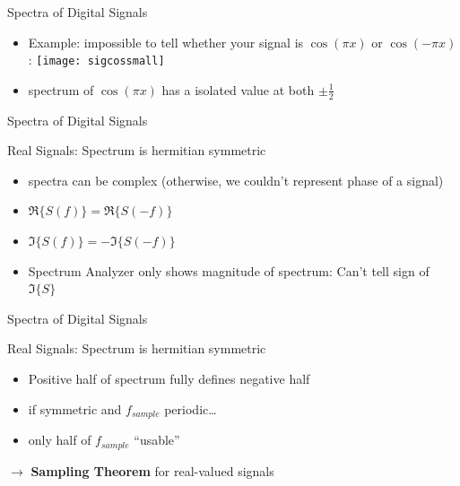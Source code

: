 \documentclass{beamer}
\begin{document}
\begin{frame}{Spectra of Digital Signals}{}

  \begin{itemize}
    \item Example: impossible to tell whether your signal is $\cos(\pi x)$ or $\cos(-\pi x)$:      \texttt{[image: sigcossmall]}
    \item spectrum of $\cos(\pi x)$ has a isolated  value at both $\pm \frac12$
  \end{itemize}

\end{frame}

\begin{frame}{Spectra of Digital Signals}{}

  Real Signals: Spectrum is hermitian symmetric

  \begin{itemize}
    \item spectra can be complex (otherwise, we couldn't represent phase of a signal)
    \item $\Re\{S(f)\} = \Re\{S(-f)\}$
    \item $\Im\{S(f)\} = -\Im\{S(-f)\}$
    \item Spectrum Analyzer only shows magnitude of spectrum: Can't tell sign of $\Im\{S\}$
  \end{itemize}

\end{frame}
\begin{frame}{Spectra of Digital Signals}{}

  Real Signals: Spectrum is hermitian symmetric

  \begin{itemize}
    \item Positive half of spectrum fully defines negative half
    \item if symmetric and $f_{sample}$ periodic\ldots
    \item only half of $f_{sample}$ ``usable''
  \end{itemize}

{ $\rightarrow$ \textbf{Sampling Theorem} for real-valued signals}
\end{frame}
\end{document}
